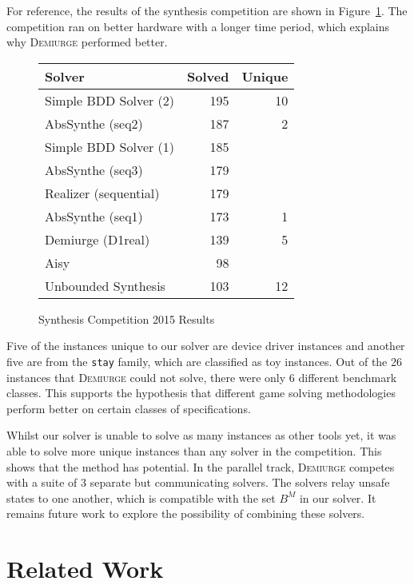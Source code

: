 \documentclass{llncs}
\begin{document}
For reference, the results of the synthesis competition are shown in
Figure~\ref{fig:syntcomp}. The competition ran on better hardware with a longer
time period, which explains why \textsc{Demiurge} performed better.

\begin{figure}
    \centering
    \setlength{\tabcolsep}{8pt}
    \begin{tabular}{l | r | r }
        \textbf{Solver} & \textbf{Solved} & \textbf{Unique} \\
        \hline
        Simple BDD Solver (2) & 195 & 10 \\
        AbsSynthe (seq2) & 187 & 2 \\
        Simple BDD Solver (1) & 185 & \\
        AbsSynthe (seq3) & 179 & \\
        Realizer (sequential) & 179 & \\
        AbsSynthe (seq1) & 173 & 1 \\
        Demiurge (D1real) & 139 & 5 \\
        Aisy & 98 & \\
        \hline
        Unbounded Synthesis & 103 & 12 \\
    \end{tabular}
    \caption{Synthesis Competition 2015 Results}
    \label{fig:syntcomp}
\end{figure}

Five of the instances unique to our solver are device driver instances and
another five are from the \texttt{stay} family, which are classified as toy
instances.  Out of the 26 instances that \textsc{Demiurge} could not solve,
there were only 6 different benchmark classes. This supports the hypothesis
that different game solving methodologies perform better on certain classes of
specifications.

Whilst our solver is unable to solve as many instances as other tools yet, it
was able to solve more unique instances than any solver in the competition.
This shows that the method has potential. In the parallel track,
\textsc{Demiurge} competes with a suite of 3 separate but communicating
solvers. The solvers relay unsafe states to one another, which is compatible
with the set $B^M$ in our solver. It remains future work to explore the
possibility of combining these solvers.

\section{Related Work}
\end{document}
